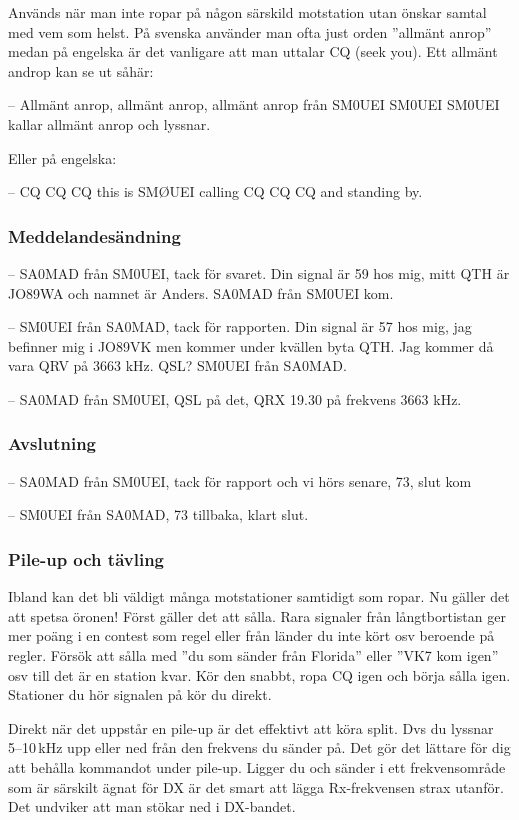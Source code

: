 Används när man inte ropar på någon särskild motstation utan önskar samtal med vem som helst. På svenska använder man ofta just orden ''allmänt anrop'' medan på engelska är det vanligare att man uttalar CQ (seek you). Ett allmänt androp kan se ut såhär:

-- Allmänt anrop, allmänt anrop, allmänt anrop från SM0UEI SM0UEI SM0UEI kallar allmänt anrop och lyssnar.

Eller på engelska:

-- CQ CQ CQ this is SMØUEI calling CQ CQ CQ and standing by.

\subsubsection{Meddelandesändning}

-- SA0MAD från SM0UEI, tack för svaret. Din signal är 59 hos mig, mitt QTH är JO89WA och namnet är Anders. SA0MAD från SM0UEI kom.

-- SM0UEI från SA0MAD, tack för rapporten. Din signal är 57 hos mig, jag befinner mig i JO89VK men kommer under kvällen byta QTH. Jag kommer då vara QRV på 3663 kHz. QSL? SM0UEI från SA0MAD.

-- SA0MAD från SM0UEI, QSL på det, QRX 19.30 på frekvens 3663 kHz.

\subsubsection{Avslutning}

-- SA0MAD från SM0UEI, tack för rapport och vi hörs senare, 73, slut kom

-- SM0UEI från SA0MAD, 73 tillbaka, klart slut.

\subsubsection{Pile-up och tävling}

Ibland kan det bli väldigt många motstationer samtidigt som ropar. Nu gäller det att spetsa öronen! Först gäller det att sålla. Rara signaler från långtbortistan ger mer poäng i en contest som regel eller från länder du inte kört osv beroende på regler. Försök att sålla med ''du som sänder från Florida'' eller ''VK7 kom igen'' osv till det är en station kvar. Kör den snabbt, ropa CQ igen och börja sålla igen. Stationer du hör signalen på kör du direkt.

Direkt när det uppstår en pile-up är det effektivt att köra split. Dvs du lyssnar 5--10\,kHz upp eller ned från den frekvens du sänder på. Det gör det lättare för dig att behålla kommandot under pile-up. Ligger du och sänder i ett frekvensområde som är särskilt ägnat för DX är det smart att lägga Rx-frekvensen strax utanför. Det undviker att man stökar ned i DX-bandet.

